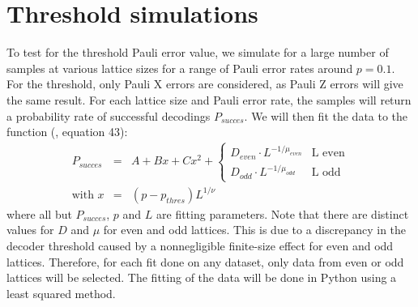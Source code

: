 \chapter{Threshold simulations}

To test for the threshold Pauli error value, we simulate for a large number of samples at various lattice sizes for a range of Pauli error rates around $p = 0.1$. For the threshold, only Pauli X errors are considered, as Pauli Z errors will give the same result. For each lattice size and Pauli error rate, the samples will return a probability rate of successful decodings $P_{succes}$. We will then fit the data to the function (\cite{chengyang}, equation 43):
\begin{eqnarray}
P_{succes} &=& A + Bx + Cx^2 + \begin{cases}
                                D_{even}\cdot L^{-1/\mu_{even}} &\mbox{L even}\\
                                D_{odd}\cdot L^{-1/\mu_{odd}} &\mbox{L odd}
                              \end{cases}\\
\mbox{with } x &=& (p - p_{thres})L^{1/\nu}
\end{eqnarray}\label{eq.4.fit}
where all but $P_{succes}$, $p$ and $L$ are fitting parameters. Note that there are distinct values for $D$ and $\mu$ for even and odd lattices. This is due to a discrepancy in the decoder threshold caused by a nonnegligible finite-size effect for even and odd lattices. Therefore, for each fit done on any dataset, only data from even or odd lattices will be selected. The fitting of the data will be done in Python using a least squared method. 